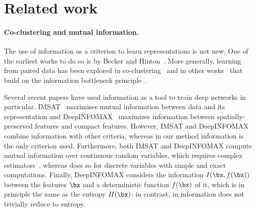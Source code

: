 \section{Related work}\label{s:related}






\paragraph{Co-clustering and mutual information.}

The use of information as a criterion to learn representations is not new. One of the earliest works to do so is by Becker and Hinton~\cite{becker1992self}.
More generally, learning from paired data has been explored in co-clustering~\cite{hartigan1972direct, dhillon2003information} and in other works~\cite{wang2010information} that build on the information bottleneck principle~\cite{friedman2001multivariate}.

Several recent papers have used information as a tool to train deep networks in particular.
IMSAT~\cite{hu2017learning} maximises mutual information between data and its representation and DeepINFOMAX~\cite{hjelm2018learning} maximizes information between spatially-preserved features and compact features.
However, IMSAT and DeepINFOMAX combine information with other criteria, whereas in our method information is the only criterion used.
Furthermore, both IMSAT and DeepINFOMAX compute mutual information over continuous random variables, which requires complex estimators~\cite{belghazi2018mine}, whereas \methodnameshort does so for discrete variables with simple and exact computations.
Finally, DeepINFOMAX considers the information $I(\bx, f(\bx))$ between the features $\bx$ and a deterministic function $f(\bx)$ of it, which is in principle the same as the entropy $H(\bx)$; in contrast, in \methodnameshort information does not trivially reduce to  entropy.

